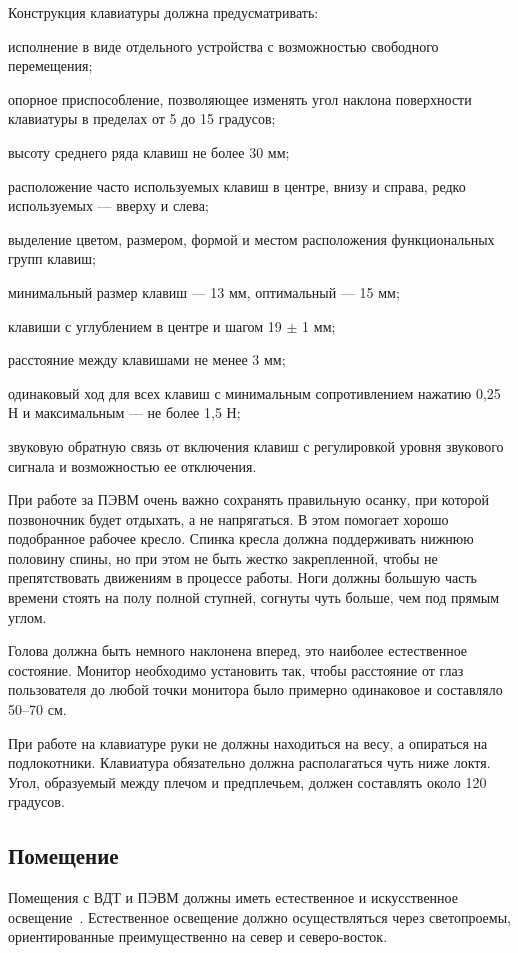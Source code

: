 Конструкция клавиатуры должна предусматривать:
\begin{compactitem}
\item исполнение в виде отдельного устройства с возможностью свободного перемещения;
\item опорное приспособление, позволяющее изменять угол наклона поверхности клавиатуры в пределах от 5 до 15 градусов;
\item высоту среднего ряда клавиш не более 30 мм;
\item расположение часто используемых клавиш в центре, внизу и справа, редко используемых --- вверху и слева;
\item выделение цветом, размером, формой и местом расположения функциональных групп клавиш;
\item минимальный размер клавиш --- 13 мм, оптимальный --- 15 мм;
\item клавиши с углублением в центре и шагом 19 $\pm$ 1 мм;
\item расстояние между клавишами не менее 3 мм;
\item одинаковый ход для всех клавиш с минимальным сопротивлением нажатию 0,25 Н и максимальным --- не более 1,5 Н;
\item звуковую обратную связь от включения клавиш с регулировкой уровня звукового сигнала и возможностью ее отключения.
\end{compactitem}

При работе за ПЭВМ очень важно сохранять правильную осанку, при которой позвоночник будет отдыхать, а не напрягаться. В этом помогает хорошо подобранное рабочее кресло. Спинка кресла должна поддерживать нижнюю половину спины, но при этом не быть жестко закрепленной, чтобы не препятствовать движениям в процессе работы. Ноги должны большую часть времени стоять на полу полной ступней, согнуты чуть больше, чем под прямым углом.

Голова должна быть немного наклонена вперед, это наиболее естественное состояние. Монитор необходимо установить так, чтобы расстояние от глаз пользователя до любой точки монитора было примерно одинаковое и составляло 50--70 см.

При работе на клавиатуре руки не должны находиться на весу, а опираться на подлокотники. Клавиатура обязательно должна располагаться чуть ниже локтя. Угол, образуемый между плечом и предплечьем, должен составлять около 120 градусов.

\subsection{Помещение}
\label{sec:bgd:pomeschenie}
 Помещения с ВДТ и ПЭВМ должны иметь естественное и искусственное освещение~\cite{BGDGigi2004}. Естественное освещение должно осуществляться через светопроемы, ориентированные преимущественно на север и северо-восток.\par{}

